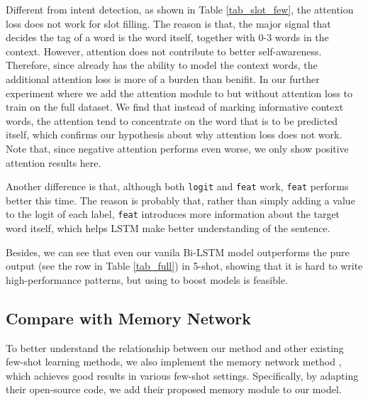 Different from intent detection, as shown in Table \ref{tab_slot_few}, the attention loss does not work for slot filling.
The reason is that, the major signal that decides the tag of a word is the word itself, together with 0-3 words in the context.
However, attention does not contribute to better self-awareness. 
Therefore, since \BLSTM already has the ability to model the context words, the additional attention loss is more of a burden than benifit.
In our further experiment where we add the attention module to \BLSTM but without attention loss to train on the full dataset. 
We find that instead of marking informative context words, the attention tend to concentrate on the word that is to be predicted itself, which confirms our hypothesis about why attention loss does not work. 
Note that, since negative attention performs even worse, we only show positive attention results here.

Another difference is that, although both \texttt{logit} and \texttt{feat} work, \texttt{feat} performs better this time. The reason is probably that, rather than simply adding a value to the logit of each label, \texttt{feat} introduces more information about the target word itself, which helps LSTM make better understanding of the sentence.


Besides, we can see that even our vanila Bi-LSTM model outperforms the pure \RE output (see the \RE row in Table \ref{tab_full}) in 5-shot, showing that it is hard to write high-performance \RE patterns, but using \RE to boost \NN models is feasible. 


\subsection{Compare with Memory Network}
To better understand the relationship between our method and other existing few-shot learning methods, we also implement the memory network method \cite{kaiser2017learning}, which achieves good results in various few-shot settings. Specifically, by adapting their open-source code, we add their proposed memory module to our \BLSTM model.

